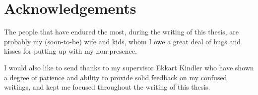 \chapter{Acknowledgements}
The people that have endured the most, during the writing of this thesis, are probably my (soon-to-be) wife and kids, whom I owe a great deal of hugs and kisses for putting up with my non-presence.\medskip

\noindent I would also like to send thanks to my supervisor Ekkart Kindler who have shown a degree of patience and ability to provide solid feedback on my confused writings, and kept me focused throughout the writing of this thesis.
